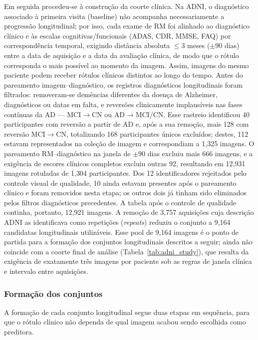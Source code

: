\documentclass[review]{elsarticle}
\begin{document}
	Em seguida procedeu-se à construção da coorte clínica.
	Na ADNI, o diagnóstico associado à primeira visita (baseline) não acompanha necessariamente a progressão longitudinal; por isso, cada exame de RM foi alinhado ao diagnóstico clínico e às escalas cognitivas/funcionais (ADAS, CDR, MMSE, FAQ) por correspondência temporal, exigindo distância absoluta $\leq 3$ meses ($\pm 90$ dias) entre a data de aquisição e a data da avaliação clínica, de modo que o rótulo corresponda o mais possível ao momento da imagem.
	Assim, imagens do mesmo paciente podem receber rótulos clínicos distintos ao longo do tempo.
	Antes do pareamento imagem--diagnóstico, os registros diagnósticos longitudinais foram filtrados: removeram-se demências diferentes da doença de Alzheimer, diagnósticos ou datas em falta, e reversões clinicamente implausíveis nas fases contínuas da AD --- MCI$\rightarrow$CN ou AD$\rightarrow$MCI/CN.
	Esse rastreio identificou 40 participantes com reversão a partir de AD e, após a sua remoção, mais 128 com reversão MCI$\rightarrow$CN, totalizando 168 participantes únicos excluídos; destes, 112 estavam representados na coleção de imagem e correspondiam a 1{,}325 imagens.
	O pareamento RM--diagnóstico na janela de $\pm 90$ dias excluiu mais 666 imagens, e a exigência de escores clínicos completos excluiu outras 92, resultando em 12{,}931 imagens rotuladas de 1{,}304 participantes.
	Dos 12 identificadores rejeitados pelo controle visual de qualidade, 10 ainda estavam presentes após o pareamento clínico e foram removidos nesta etapa; os outros dois já tinham sido eliminados pelos filtros diagnósticos precedentes.
	A tabela após o controle de qualidade continha, portanto, 12{,}921 imagens.
	A remoção de 3{,}757 aquisições cuja descrição ADNI as identificava como repetições (\emph{repeats}) reduziu o conjunto a 9{,}164 candidatas longitudinais utilizáveis.
	Esse pool de 9{,}164 imagens é o ponto de partida para a formação dos conjuntos longitudinais descritos a seguir; ainda não coincide com a coorte final de análise (Tabela~\ref{tab:adni_study}), que resulta da exigência de exatamente três imagens por paciente sob as regras de janela clínica e intervalo entre aquisições.
	
	
	\subsubsection{Formação dos conjuntos}
	\label{subsec:formacao}
	
	A formação de cada conjunto longitudinal segue duas etapas em sequência, para que o rótulo clínico não dependa de qual imagem acabou sendo escolhida como preditora.
	
\end{document}
